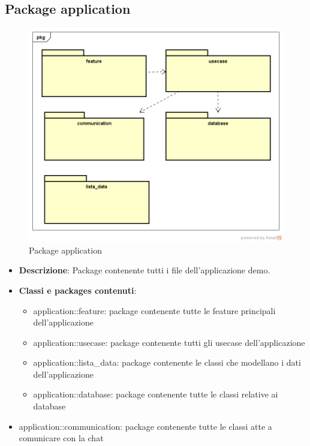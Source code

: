 \subsection{Package application}
\label{Package application}
\begin{figure}[H]
	\centering
	\includegraphics[scale=0.5]{Sezioni/Packages/Application/application.png}
	\caption{Package application}
\end{figure}
\begin{itemize}
	\item \textbf{Descrizione}: Package contenente tutti i file dell'applicazione demo.
	\item \textbf{Classi e packages contenuti}:
	\begin{itemize}
		\item application::feature: package contenente tutte le feature principali dell'applicazione
		\item application::usecase: package contenente tutti gli usecase dell'applicazione
		\item application::lista\_data: package contenente le classi che modellano i dati dell'applicazione
		\item application::database: package contenente tutte le classi relative ai database
	\end{itemize}
	\item application::communication: package contenente tutte le classi atte a comunicare con la chat
\end{itemize}


